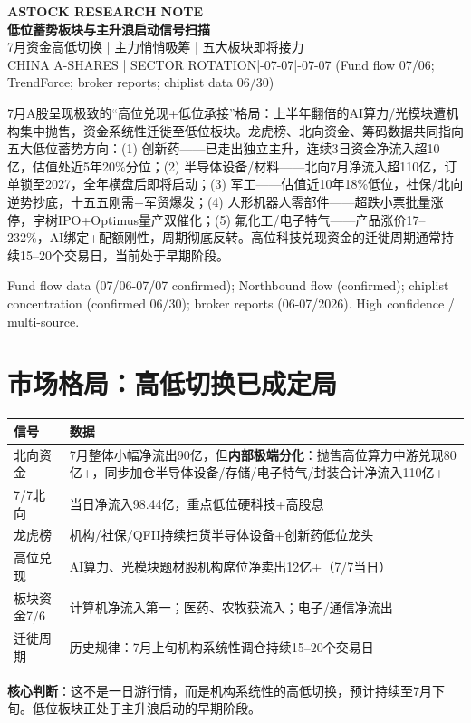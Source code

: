 \documentclass[a4paper,11pt,fontset=none]{ctexart}
\newcommand{\reporttitle}{低位蓄势板块与主升浪启动信号扫描}
\newcommand{\reportsubtitle}{7月资金高低切换 | 主力悄悄吸筹 | 五大板块即将接力}
\newcommand{\reportkicker}{ASTOCK RESEARCH NOTE}
\newcommand{\reportscope}{CHINA A-SHARES | SECTOR ROTATION}
\newcommand{\reportdate}{2026-07-07}
\newcommand{\reportdatacutoff}{2026-07-07 (Fund flow 07/06; TrendForce; broker reports; chiplist data 06/30)}
\newcommand{\reporthouseview}{%
7月A股呈现极致的``高位兑现+低位承接''格局：上半年翻倍的AI算力/光模块遭机构集中抛售，资金系统性迁徙至低位板块。龙虎榜、北向资金、筹码数据共同指向五大低位蓄势方向：(1) 创新药——已走出独立主升，连续3日资金净流入超10亿，估值处近5年20\%分位；(2) 半导体设备/材料——北向7月净流入超110亿，订单锁至2027，全年横盘后即将启动；(3) 军工——估值近10年18\%低位，社保/北向逆势抄底，十五五刚需+军贸爆发；(4) 人形机器人零部件——超跌小票批量涨停，宇树IPO+Optimus量产双催化；(5) 氟化工/电子特气——产品涨价17--232\%，AI绑定+配额刚性，周期彻底反转。高位科技兑现资金的迁徙周期通常持续15--20个交易日，当前处于早期阶段。%
}
\newcommand{\reportquality}{Fund flow data (07/06-07/07 confirmed); Northbound flow (confirmed); chiplist concentration (confirmed 06/30); broker reports (06-07/2026). High confidence / multi-source.}
\begin{document}
\begin{center}
{\sffamily\small\bfseries\color{steelgrey} \reportkicker}\\[3pt]
{\LARGE\bfseries\color{navy} \reporttitle}\\[5pt]
{\large\color{steelgrey} \reportsubtitle}\\[4pt]
{\small\color{mutedgrey} \reportscope \quad|\quad \reportdate \quad|\quad \reportdatacutoff}
\end{center}
\vspace{0.7em}

\begin{dashboardbox}
\begin{houseviewbox}
\reporthouseview
\end{houseviewbox}
\begin{sourcequalitybox}
\reportquality
\end{sourcequalitybox}
\end{dashboardbox}

\section{市场格局：高低切换已成定局}

\begin{exhibitbox}
\begin{tabularx}{\textwidth}{L{4cm}X}
\toprule
\textbf{信号} & \textbf{数据} \\
\midrule
北向资金 & 7月整体小幅净流出90亿，但\textbf{内部极端分化}：抛售高位算力中游兑现80亿+，同步加仓半导体设备/存储/电子特气/封装合计净流入110亿+ \\
7/7北向 & 当日净流入98.44亿，重点低位硬科技+高股息 \\
龙虎榜 & 机构/社保/QFII持续扫货半导体设备+创新药低位龙头 \\
高位兑现 & AI算力、光模块题材股机构席位净卖出12亿+（7/7当日） \\
板块资金7/6 & 计算机净流入第一；医药、农牧获流入；电子/通信净流出 \\
迁徙周期 & 历史规律：7月上旬机构系统性调仓持续15--20个交易日 \\
\bottomrule
\end{tabularx}
\end{exhibitbox}

\textbf{核心判断}：这不是一日游行情，而是机构系统性的高低切换，预计持续至7月下旬。低位板块正处于主升浪启动的早期阶段。
\end{document}
